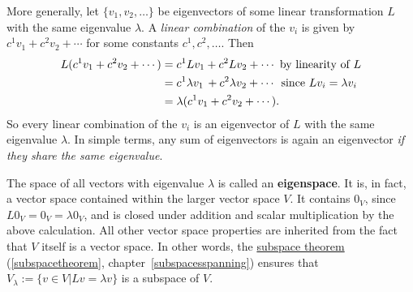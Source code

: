 More generally, let $\{ v_1, v_2, \ldots \}$ be eigenvectors of some linear transformation $L$ with the same eigenvalue $\lambda$.  A \emph{linear combination} of the $v_i$ is given by $c^1v_1+c^2v_2+\cdots$ for some constants $c^1, c^2,\ldots$.  Then
\begin{align*}
L(c^1v_1+c^2v_2+\cdots)
&= c^1Lv_1+c^2Lv_2+\cdots \text{ by linearity of $L$}\\
&= c^1\lambda v_1\,+c^2\lambda v_2+\cdots \hspace{.5mm} \text{ since $Lv_i=\lambda v_i$ }\\
&= \lambda (c^1v_1+c^2v_2+\cdots).
\end{align*}
So every linear combination of the $v_i$ is an eigenvector of $L$ with the same eigenvalue $\lambda$.
In simple terms, any sum of eigenvectors is again an eigenvector {\itshape if they share the same eigenvalue}.

The space of all vectors with eigenvalue $\lambda$ is called an {\bfseries eigenspace}.  It is, in fact, a vector space contained within the larger vector space $V$.  It contains $0_V$, since $L0_V=0_V=\lambda 0_V$, and is closed under addition and scalar multiplication by the above calculation.  All other vector space properties are inherited from the fact that $V$ itself is a vector space. In other words, the \hyperlink{sst}{subspace theorem} (\ref{subspacetheorem}, chapter~\ref{subspacesspanning}) ensures that $V_\lambda:=\{v\in V|Lv=\lambda v\}$ is a subspace of $V$.




